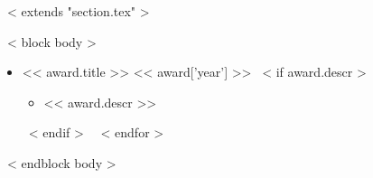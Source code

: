 ~< extends "section.tex" >~

~< block body >~
\begin{itemize}
  ~< for award in items >~
    \item << award.title >> \hfill << award['year'] >>
    ~< if award.descr >~
      \begin{itemize}
      \item[] << award.descr >>
      \end{itemize}
    ~< endif >~
  ~< endfor >~
\end{itemize}
~< endblock body >~
